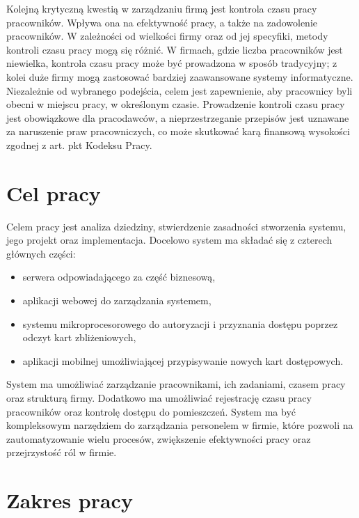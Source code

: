 Kolejną krytyczną kwestią w zarządzaniu firmą jest kontrola czasu pracy pracowników. Wpływa ona na efektywność pracy, a także na zadowolenie pracowników. W zależności od wielkości firmy oraz od jej specyfiki, metody kontroli czasu pracy mogą się różnić. W firmach, gdzie liczba pracowników jest niewielka, kontrola czasu pracy może być prowadzona w sposób tradycyjny; z kolei duże firmy mogą zastosować bardziej zaawansowane systemy informatyczne. Niezależnie od wybranego podejścia, celem jest zapewnienie, aby pracownicy byli obecni w miejscu pracy, w określonym czasie. Prowadzenie kontroli czasu pracy jest obowiązkowe dla pracodawców, a nieprzestrzeganie przepisów jest uznawane za naruszenie praw pracowniczych, co może skutkować karą finansową wysokości zgodnej z art.  pkt  Kodeksu Pracy. \cite{bib:KodeksPracy}

\section{Cel pracy}


Celem pracy jest analiza dziedziny, stwierdzenie zasadności stworzenia systemu, jego projekt oraz implementacja. Docelowo system ma składać się z czterech głównych części:

\begin{itemize}
    \item serwera odpowiadającego za część biznesową,
    \item aplikacji webowej do zarządzania systemem,
    \item systemu mikroprocesorowego do autoryzacji i przyznania dostępu poprzez odczyt kart zbliżeniowych,
    \item aplikacji mobilnej umożliwiającej przypisywanie nowych kart dostępowych.
\end{itemize}

System ma umożliwiać zarządzanie pracownikami, ich zadaniami, czasem pracy oraz strukturą firmy. Dodatkowo ma umożliwiać rejestrację czasu pracy pracowników oraz kontrolę dostępu do pomieszczeń. System ma być kompleksowym narzędziem do zarządzania personelem w firmie, które pozwoli na zautomatyzowanie wielu procesów, zwiększenie efektywności pracy oraz przejrzystość ról w firmie.

\section{Zakres pracy}

